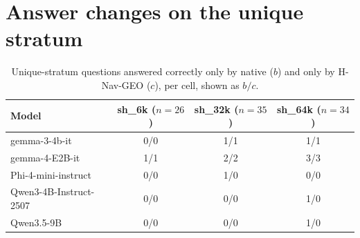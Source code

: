\documentclass{CUP-JNL-NLP}
\newcommand{\sub}[1]{\textsf{sh\_#1}}                    %
\newcommand{\geo}{H-Nav-GEO}
\begin{document}
\section{Answer changes on the unique stratum}
\label{app:flips}

\begin{table}[!htbp]\centering\small
\caption{Unique-stratum questions answered correctly only by native ($b$) and only by \geo{} ($c$), per cell, shown as $b/c$.}
\label{tab:flips}
\begin{tabular}{lccc}\toprule
Model & \sub{6k} ($n=26$) & \sub{32k} ($n=35$) & \sub{64k} ($n=34$)\\\midrule
gemma-3-4b-it          & 0/0 & 1/1 & 1/1\\
gemma-4-E2B-it         & 1/1 & 2/2 & 3/3\\
Phi-4-mini-instruct    & 0/0 & 1/0 & 0/0\\
Qwen3-4B-Instruct-2507 & 0/0 & 0/0 & 1/0\\
Qwen3.5-9B             & 0/0 & 0/0 & 1/0\\\bottomrule
\end{tabular}\end{table}

\label{lastpage}
\end{document}

